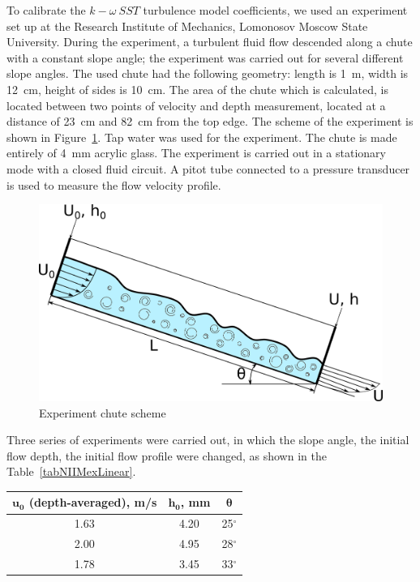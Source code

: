 \documentclass[sensors,article,submit,moreauthors,pdftex]{Definitions/mdpi}
\begin{document}
To calibrate the $k-\omega\ SST$ turbulence model coefficients, we used an experiment set up at the Research Institute of Mechanics, Lomonosov Moscow State University. During the experiment, a turbulent fluid flow descended along a chute with a constant slope angle; the experiment was carried out for several different slope angles. The used chute had the following geometry: length is 1~m, width is 12~cm, height of sides is 10~cm. The area of the chute which is calculated, is located between two points of velocity and depth measurement, located at a distance of 23~cm and 82~cm from the top edge. The scheme of the experiment is shown in Figure~\ref{NIIMexLinearUProfileInlet}. Tap water was used for the experiment. The chute is made entirely of 4~mm acrylic glass. The experiment is carried out in a stationary mode with a closed fluid circuit. A pitot tube connected to a pressure transducer is used to measure the flow velocity profile.

\begin{figure}[H]	
\widefigure
\includegraphics[width=10 cm]{NIIMexLinearUProfileInlet.png}
\caption{Experiment chute scheme\label{NIIMexLinearUProfileInlet}}
\end{figure}

Three series of experiments were carried out, in which the slope angle, the initial flow depth, the initial flow profile were changed, as shown in the Table~\ref{tabNIIMexLinear}.

\begin{specialtable}[H] 
\caption{Experiments parameters\label{tabNIIMexLinear}}
\begin{tabular}{ | c | c | c | }
\toprule
\textbf{$\boldsymbol{u_0}$ (depth-averaged), m/s}	& \textbf{$\boldsymbol{h_0}$, mm}	& \textbf{$\boldsymbol{\theta}$}\\
\midrule
1.63 & 4.20 & 25$^\circ$\\
2.00 & 4.95 & 28$^\circ$\\
1.78 & 3.45 & 33$^\circ$\\
\bottomrule
\end{tabular}
\end{specialtable}
\end{document}
